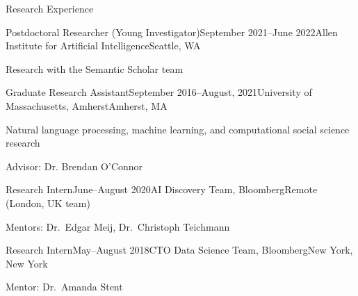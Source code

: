 \documentclass{resume} %
\begin{document}
\begin{rSection}{Research Experience}

\begin{rSubsection}{Postdoctoral Researcher (Young Investigator)}{September 2021--June 2022}{Allen Institute for Artificial Intelligence}{Seattle, WA}
\item Research with the Semantic Scholar team
\end{rSubsection}

\begin{rSubsection}{Graduate Research Assistant}{September 2016--August, 2021}{University of Massachusetts, Amherst}{Amherst, MA}
\item Natural language processing, machine learning, and computational social science research
\item Advisor: Dr. Brendan O'Connor 
\end{rSubsection}

\begin{rSubsection}{Research Intern}{June--August 2020}{AI Discovery Team, Bloomberg}{Remote (London, UK team)}
\item Mentors: Dr.~Edgar Meij, Dr.~Christoph Teichmann
\end{rSubsection}

\begin{rSubsection}{Research Intern}{May--August 2018}{CTO Data Science Team, Bloomberg}{New York, New York}
\item Mentor: Dr.~Amanda Stent
\end{rSubsection}



\end{rSection}
\end{document}
